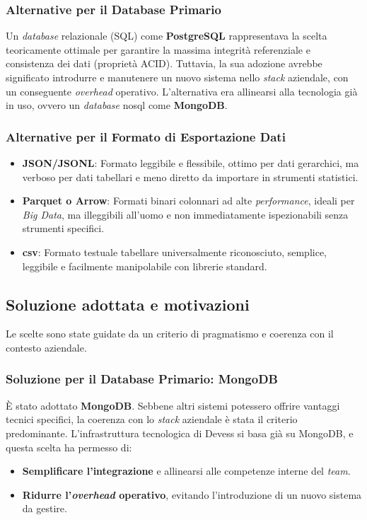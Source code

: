 \subsubsection{Alternative per il Database Primario}
Un \textit{database} relazionale (SQL) come \textbf{PostgreSQL} rappresentava la scelta teoricamente ottimale per garantire la massima integrità referenziale e consistenza dei dati (proprietà ACID). Tuttavia, la sua adozione avrebbe significato introdurre e manutenere un nuovo sistema nello \textit{stack} aziendale, con un conseguente \textit{overhead} operativo. L'alternativa era allinearsi alla tecnologia già in uso, ovvero un \textit{database} \gls{nosql} come \textbf{MongoDB}.

\subsubsection{Alternative per il Formato di Esportazione Dati}
\begin{itemize}
    \item \textbf{JSON/JSONL}: Formato leggibile e flessibile, ottimo per dati gerarchici, ma verboso per dati tabellari e meno diretto da importare in strumenti statistici.
    \item \textbf{Parquet o Arrow}: Formati binari colonnari ad alte \textit{performance}, ideali per \textit{Big Data}, ma illeggibili all'uomo e non immediatamente ispezionabili senza strumenti specifici.
    \item \textbf{\gls{csv}}: Formato testuale tabellare universalmente riconosciuto, semplice, leggibile e facilmente manipolabile con librerie standard.
\end{itemize}

\subsection{Soluzione adottata e motivazioni}
Le scelte sono state guidate da un criterio di pragmatismo e coerenza con il contesto aziendale.

\subsubsection{Soluzione per il Database Primario: MongoDB}
È stato adottato \textbf{MongoDB}. Sebbene altri sistemi potessero offrire vantaggi tecnici specifici, la coerenza con lo \textit{stack} aziendale è stata il criterio predominante. L'infrastruttura tecnologica di Devess si basa già su MongoDB, e questa scelta ha permesso di:
\begin{itemize}
    \item \textbf{Semplificare l'integrazione} e allinearsi alle competenze interne del \textit{team}.
    \item \textbf{Ridurre l'\textit{overhead} operativo}, evitando l'introduzione di un nuovo sistema da gestire.
\end{itemize}

